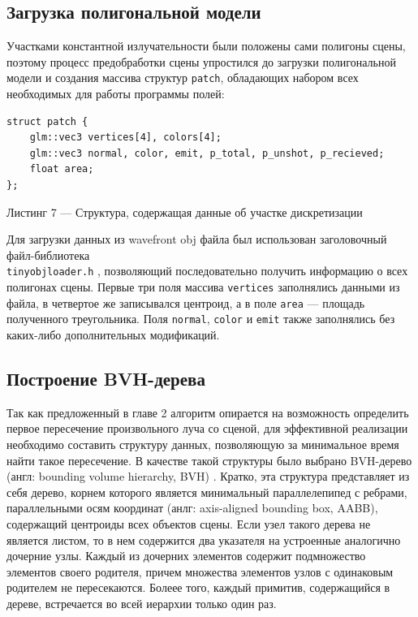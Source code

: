 \documentclass[12pt]{article}
\begin{document}
\subsection{Загрузка полигональной модели}
Участками константной излучательности были положены сами полигоны сцены, поэтому процесс предобработки сцены упростился до загрузки полигональной модели и создания массива структур \texttt{patch}, обладающих набором всех необходимых для работы программы полей:
\begin{lstlisting}
struct patch {
    glm::vec3 vertices[4], colors[4];
    glm::vec3 normal, color, emit, p_total, p_unshot, p_recieved;
    float area;
};
\end{lstlisting}
\begin{center}Листинг 7 --- Структура, содержащая данные об участке дискретизации \end{center}

Для загрузки данных из wavefront obj файла был использован заголовочный файл-библиотека\\ \texttt{tinyobjloader.h} \cite{Fuj12}, позволяющий последовательно получить информацию о всех полигонах сцены. Первые три поля массива \texttt{vertices} заполнялись данными из файла, в четвертое же записывался центроид, а в поле \texttt{area} --- площадь полученного треугольника. Поля \texttt{normal}, \texttt{color} и \texttt{emit} также заполнялись без каких-либо дополнительных модификаций.
\subsection{Построение BVH-дерева}
Так как предложенный в главе 2 алгоритм опирается на возможность определить первое пересечение произвольного луча со сценой, для эффективной реализации необходимо составить структуру данных, позволяющую за минимальное время найти такое пересечение. В качестве такой структуры было выбрано BVH-дерево (англ: bounding volume hierarchy, BVH) \cite{KK86}. Кратко, эта структура представляет из себя дерево, корнем которого является минимальный параллелепипед с ребрами, параллельными осям координат (анлг: axis-aligned bounding box, AABB), содержащий центроиды всех объектов сцены. Если узел такого дерева не является листом, то в нем содержится два указателя на устроенные аналогично дочерние узлы. Каждый из дочерних элементов содержит подмножество элементов своего родителя, причем множества элементов узлов с одинаковым родителем не пересекаются.  Болеее того, каждый примитив, содержащийся в дереве, встречается во всей иерархии только один раз. 
\end{document}
